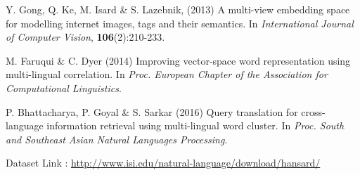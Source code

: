 \documentclass{article} %
\begin{document}




\begin{thebibliography}{1}
	
Y. Gong, Q. Ke, M. Isard \& S. Lazebnik, (2013) A multi-view embedding space for modelling internet images, tags and their semantics. In {\it International Journal of Computer Vision}, {\bf 106}(2):210-233.
	
M. Faruqui \& C. Dyer (2014) Improving vector-space word representation using multi-lingual correlation. In {\it Proc. European Chapter of the Association for Computational Linguistics}.
	
P. Bhattacharya, P. Goyal \& S. Sarkar (2016) Query translation for cross-language information retrieval using multi-lingual word cluster. In {\it Proc. South and Southeast Asian Natural Languages Processing}.

Dataset Link : \url{http://www.isi.edu/natural-language/download/hansard/}

\end{thebibliography}
\end{document}
